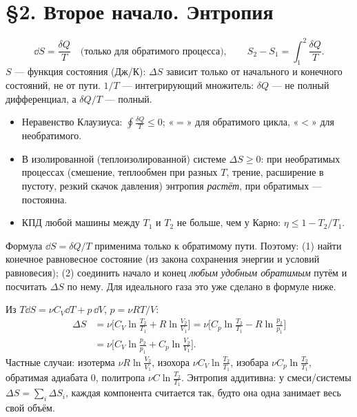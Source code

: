 \section*{§2. Второе начало. Энтропия}

\begin{basics}
\[\dd S=\frac{\delta Q}{T}\quad\text{(только для обратимого процесса)},\qquad S_2-S_1=\int_1^2\frac{\delta Q}{T}.\]
$S$ — функция состояния (Дж/К): $\Delta S$ зависит только от начального и конечного состояний, не от пути.
$1/T$ — интегрирующий множитель: $\delta Q$ — не полный дифференциал, а $\delta Q/T$ — полный.

\begin{itemize}
\item Неравенство Клаузиуса: $\displaystyle\oint\frac{\delta Q}{T}\le0$; «$=$» для обратимого цикла, «$<$» для необратимого.
\item В изолированной (теплоизолированной) системе $\Delta S\ge0$: при необратимых процессах (смешение, теплообмен при
разных $T$, трение, расширение в пустоту, резкий скачок давления) энтропия \emph{растёт}, при обратимых — постоянна.
\item КПД любой машины между $T_1$ и $T_2$ не больше, чем у Карно: $\eta\le1-T_2/T_1$.
\end{itemize}

Формула $\dd S=\delta Q/T$ применима только к обратимому пути. Поэтому:
(1) найти конечное равновесное состояние (из закона сохранения энергии и условий равновесия);
(2) соединить начало и конец \emph{любым удобным обратимым} путём и посчитать $\Delta S$ по нему.
Для идеального газа это уже сделано в формуле ниже.

Из $T\dd S=\nu C_V\dd T+p\,\dd V$, $p=\nu RT/V$:
\begin{align*}
\Delta S&=\nu\Big[C_V\ln\frac{T_2}{T_1}+R\ln\frac{V_2}{V_1}\Big]
=\nu\Big[C_p\ln\frac{T_2}{T_1}-R\ln\frac{p_2}{p_1}\Big]\\
&=\nu\Big[C_V\ln\frac{p_2}{p_1}+C_p\ln\frac{V_2}{V_1}\Big].
\end{align*}
Частные случаи: изотерма $\nu R\ln\frac{V_2}{V_1}$, изохора $\nu C_V\ln\frac{T_2}{T_1}$,
изобара $\nu C_p\ln\frac{T_2}{T_1}$, обратимая адиабата $0$, политропа $\nu C\ln\frac{T_2}{T_1}$.
Энтропия аддитивна: у смеси/системы $\Delta S=\sum_i\Delta S_i$, каждая компонента считается так, будто она одна
занимает весь свой объём.


\end{basics}
